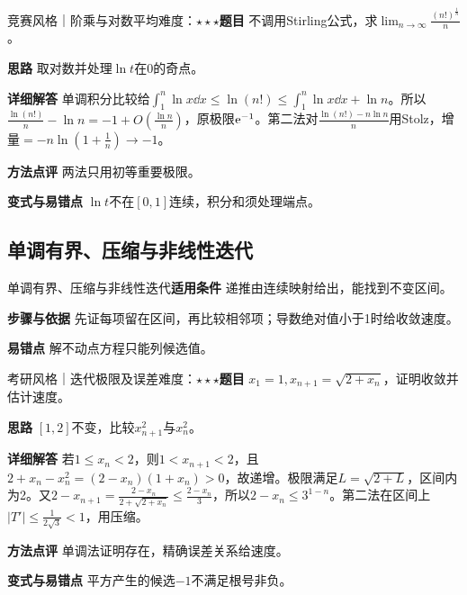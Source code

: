 \begin{example}{竞赛风格｜阶乘与对数平均}{难度：$\star\star\star$}\label{deep:ex:limits_source_deep:factorial}\textbf{题目} 不调用Stirling公式，求$\lim_{n\to\infty}\frac{(n!)^{\frac{1}{n}}}{n}$。\par\textbf{思路} 取对数并处理$\ln t$在0的奇点。\par\textbf{详细解答} 单调积分比较给$\int_1^n\ln x\dd x\le\ln(n!)\le\int_1^n\ln x\dd x+\ln n$。所以$\frac{\ln(n!)}{n}-\ln n=-1+O(\frac{\ln n}{n})$，原极限$\mathrm{e}^{-1}$。第二法对$\frac{\ln(n!)-n\ln n}{n}$用Stolz，增量$=-n\ln(1+\frac{1}{n})\to-1$。\par\textbf{方法点评} 两法只用初等重要极限。\par\textbf{变式与易错点} $\ln t$不在$[0,1]$连续，积分和须处理端点。\end{example}

\subsection{单调有界、压缩与非线性迭代}\label{deep:limits_source_deep:recurrence}

\begin{method}{单调有界、压缩与非线性迭代}\textbf{适用条件} 递推由连续映射给出，能找到不变区间。\par\textbf{步骤与依据} 先证每项留在区间，再比较相邻项；导数绝对值小于1时给收敛速度。\par\textbf{易错点} 解不动点方程只能列候选值。\end{method}

\begin{example}{考研风格｜迭代极限及误差}{难度：$\star\star\star$}\label{deep:ex:limits_source_deep:sqrt}\textbf{题目} $x_1=1,x_{n+1}=\sqrt{2+x_n}$，证明收敛并估计速度。\par\textbf{思路} $[1,2]$不变，比较$x_{n+1}^2$与$x_n^2$。\par\textbf{详细解答} 若$1\le x_n<2$，则$1<x_{n+1}<2$，且$2+x_n-x_n^2=(2-x_n)(1+x_n)>0$，故递增。极限满足$L=\sqrt{2+L}$，区间内为2。又$2-x_{n+1}=\frac{2-x_n}{2+\sqrt{2+x_n}}\le\frac{2-x_n}{3}$，所以$2-x_n\le3^{1-n}$。第二法在区间上$|T'|\le\frac{1}{2\sqrt3}<1$，用压缩。\par\textbf{方法点评} 单调法证明存在，精确误差关系给速度。\par\textbf{变式与易错点} 平方产生的候选$-1$不满足根号非负。\end{example}

